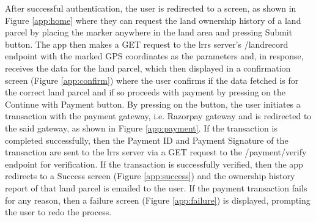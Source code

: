 \documentclass[12pt]{article}
\begin{document}
        After successful authentication, the user is redirected to a screen, as shown in Figure \ref{app:home} where they can request the land ownership history of a land parcel by placing the marker anywhere in the land area and pressing Submit button. The app then makes a GET request to the \acrshort{lrrs} server's /landrecord endpoint with the marked GPS coordinates as the parameters and, in response, receives the data for the land parcel, which then displayed in a confirmation screen (Figure \ref{app:confirm}) where the user confirms if the data fetched is for the correct land parcel and if so proceeds with payment by pressing on the Continue with Payment button. By pressing on the button, the user initiates a transaction with the payment gateway, i.e. Razorpay gateway and is redirected to the said gateway, as shown in Figure \ref{app:payment}. If the transaction is completed successfully, then the Payment ID and Payment Signature of the transaction are sent to the \acrshort{lrrs} server via a GET request to the /payment/verify endpoint for verification. If the transaction is successfully verified, then the app redirects to a Success screen (Figure \ref{app:success}) and the ownership history report of that land parcel is emailed to the user. If the payment transaction fails for any reason, then a failure screen (Figure \ref{app:failure}) is displayed, prompting the user to redo the process.
        
\end{document}
